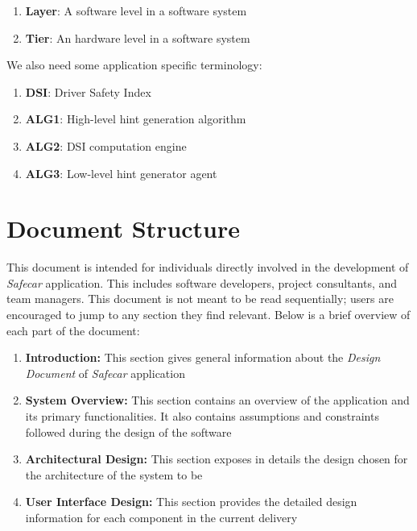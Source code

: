 \begin{enumerate}
	\item \textbf{Layer}: A software level in a software system
	\item \textbf{Tier}: An hardware level in a software system
\end{enumerate}
We also need some application specific terminology:

\begin{enumerate}
	\item \textbf{DSI}: Driver Safety Index
	\item \textbf{ALG1}: High-level hint generation algorithm
	\item \textbf{ALG2}: DSI computation engine
	\item \textbf{ALG3}: Low-level hint generator agent
\end{enumerate}

\section{Document Structure}
This document is intended for individuals directly involved in the development of \textit{Safecar} application. This includes software developers, project consultants, and team managers. This document is not meant to be read sequentially; users are encouraged to jump to any section they find relevant. Below is a brief overview of each part of the document:

\begin{enumerate}
	\item \textbf{Introduction:} This section gives general information about the \textit{Design Document} of \textit{Safecar} application
	\item \textbf{System Overview:} This section contains an overview of the application and its primary functionalities. It also contains assumptions and constraints followed during the design of the software
	\item \textbf{Architectural Design:} This section exposes in details the design chosen for the architecture of the system to be
	\item \textbf{User Interface Design:} This section provides the detailed design information for each component in the current delivery
\end{enumerate}
